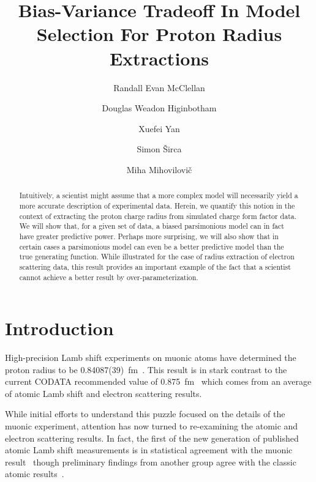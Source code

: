 \documentclass[10pt,aps,prc,twocolumn]{revtex4-1}
\begin{document}
\title{Bias-Variance Tradeoff In Model Selection For Proton Radius Extractions}

\author{Randall Evan McClellan}
\author{Douglas Weadon Higinbotham}
\author{Xuefei Yan}
\author{Simon \v{S}irca}
\author{Miha Mihovilovi\v{c}}

\begin{abstract}
Intuitively, a scientist might assume that a more complex model will necessarily yield a more 
accurate description of experimental data.   Herein, we quantify this notion in the context of extracting 
the proton charge radius from simulated charge form factor data.  We will show that, for a given set of data, 
a biased parsimonious model can in fact have greater predictive power.  Perhaps more surprising,
we will also show that in certain cases a parsimonious model can even be a better predictive model 
than the true generating function.   While illustrated for the case of radius extraction of electron scattering data,
this result provides an important example of the fact that a scientist cannot achieve a better result by
over-parameterization.
\end{abstract}

\maketitle

\section{Introduction}

High-precision Lamb shift experiments on muonic atoms have determined the proton radius to 
be 0.84087(39)~fm~\cite{Pohl:2010zza,Antognini:1900ns}.   This result is in stark contrast to the current
CODATA recommended value of 0.875~fm~\cite{Mohr:2015ccw} which comes from an average of atomic 
Lamb shift and electron scattering results.  

While initial efforts to understand this puzzle focused on the details of the muonic experiment, attention has
now turned to re-examining the atomic and electron scattering results.   In fact, the first of the
new generation of published atomic Lamb shift measurements is in statistical agreement with the muonic 
result~\cite{Beyer79} though preliminary findings from another group agree with the classic atomic 
results~\cite{fleurbaey:tel-01633631}.
\end{document}
